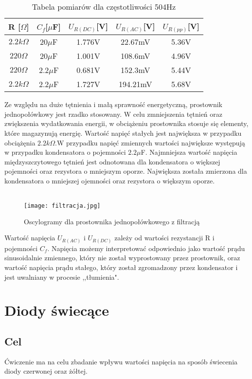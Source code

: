 \documentclass[polish,a4paper]{article}
\begin{document}
\begin{table}[H]
\centering
\begin{tabular}{|c|c||c|c|c|}
\hline
R [$\Omega$] & $C_{f}$[$\mu$F] & $U_{R(DC)}$[V] & $U_{R(AC)}$[V]&$ U_{R(pp)}$[V]\\
\hline 
$2.2k\Omega$ & $20\mu$F & 1.776V & 22.67mV & 5.36V\\
\hline
$220\Omega$ & $20\mu$F & 1.001V & 108.6mV & 4.96V\\
\hline
$220\Omega$ & $2.2\mu$F & 0.681V &152.3mV & 5.44V\\
\hline
$2.2k\Omega$ & $2.2\mu$F & 1.727V & 194.21mV & 5.68V\\
\hline
\end{tabular}
\caption{Tabela pomiarów dla częstotliwości 504Hz}
\end{table}

Ze względu na duże tętnienia i małą sprawność energetyczną,
prostownik jednopołówkowy jest rzadko stosowany. W celu zmniejszenia tętnień oraz
zwiększenia wydatkowania energii, w obciążeniu prostownika stosuje się
elementy,   które   magazynują   energię. 
Wartość napięć stałych jest największa w przypadku obciążęnia $2.2k\Omega$.W przypadku napięć zmiennych wartości największe występują w przypadku kondensatora o pojemności $2.2\mu$F. Najmniejsza wartość  napięcia międzyszczytowego tętnień jest odnotowana dla kondensatora o większej pojemności oraz rezystora o mniejszym oporze. Największa została zmierzona dla kondensatora o mniejszej ojemności oraz rezystora o większym oporze. 
\\
\\
\begin{figure}[H]
\centering
\texttt{[image: filtracja.jpg]}
\caption{Oscylogramy dla prostownika jednopołówkowego z filtracją}
\end{figure}

Wartość napięcia $U_{R(AC)}$ i $U_{R(DC)}$ zależy od wartości rezystancji R i pojemności $C_f$. Napięcia możemy interpretować odpowiednio jako wartość prądu sinusoidalnie zmiennego, który nie został wyprostowany przez prostownik, oraz wartość napięcia prądu stałego, który został zgromadzony przez kondensator i jest uwalniany w procesie ,,tłumienia".
\section{Diody świecące}
\subsection{Cel}
Ćwiczenie ma na celu zbadanie wpływu wartości napięcia na sposób świecenia diody czerwonej oraz żółtej.
\end{document}
